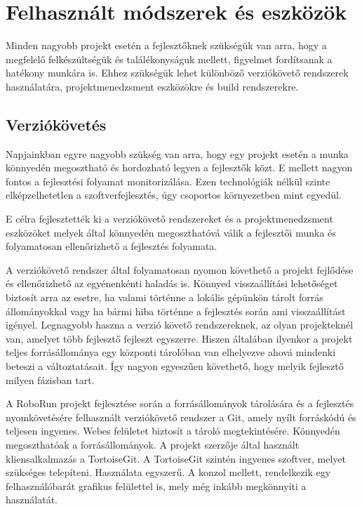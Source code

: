 \chapter{Felhasznált módszerek és eszközök}\label{ch:MODSZEREK_ES_ESZKOZOK}

\begin{osszefoglal}
	Minden nagyobb projekt esetén a fejlesztőknek szükségük van arra, hogy a megfelelő felkészültségük és találékonyságuk mellett, figyelmet fordítsanak a hatékony munkára is. Ehhez szükségük lehet különböző verziókövető rendszerek használatára, projektmenedzsment eszközökre és build rendszerekre.
\end{osszefoglal}


\section{Verziókövetés}

Napjainkban egyre nagyobb szükség van arra, hogy egy projekt esetén a munka könnyedén megosztható és hordozható legyen a fejlesztők közt. E mellett nagyon fontos a fejlesztési folyamat monitorizálása. Ezen technológiák nélkül szinte elképzelhetetlen a szoftverfejlesztés, úgy csoportos környezetben mint egyedül.

	E célra fejlesztették  ki a verziókövető rendszereket és a projektmenedzsment eszközöket melyek által könnyedén megoszthatóvá válik a fejlesztői munka és folyamatosan ellenőrizhető a fejlesztés folyamata.  
	
	A verziókövető rendszer által  folyamatosan nyomon követhető a projekt fejlődése és ellenőrizhető az egyénenkénti haladás is. Könnyed visszaállítási lehetőséget biztosít arra az esetre, ha valami történne a lokális gépünkön tárolt forrás állományokkal vagy ha bármi hiba történne a fejlesztés során ami visszaállítást igényel. Legnagyobb haszna a verzió követő rendszereknek, az olyan projekteknél van, amelyet több fejlesztő fejleszt egyszerre. Hiszen általában ilyenkor a projekt teljes forrásállománya egy központi tárolóban van elhelyezve ahová mindenki beteszi a változtatásait. Így nagyon egyeszűen követhető, hogy melyik fejlesztő milyen fázisban tart. 
	
	A RoboRun projekt fejlesztése során a forrásállományok tárolására és a fejlesztés nyomkövetésére felhasznált verziókövető rendszer a Git\citep{git}, amely nyílt forráskódú és teljesen ingyenes. Webes felületet biztosít a tároló megtekintésére. Könnyedén megoszthatóak a forrásállományok. A projekt szerzője által használt kliensalkalmazás a  TortoiseGit\citep{tortoisegit}. A TortoiseGit szintén ingyenes szoftver, melyet szükséges telepíteni. Használata egyszerű. A konzol mellett, rendelkezik egy felhasználóbarát grafikus felülettel is, mely még inkább megkönnyíti a használatát.

